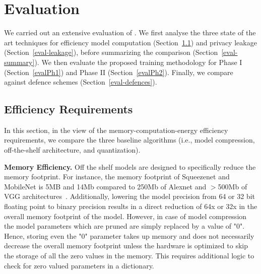 \section{Evaluation}
\label{compare}

We carried out an extensive evaluation of \method.
We first analyse the three state of the art techniques for efficiency model computation (Section~\ref{eval-efficiency}) and privacy leakage (Section~\ref{eval-leakage}), before summarizing the comparison (Section~\ref{eval-summary}).
We then evaluate the proposed training methodology for Phase I (Section~\ref{evalPh1}) and Phase II (Section~\ref{evalPh2}).
Finally, we compare \method~ against defence schemes (Section~\ref{eval-defences}). %


\subsection{Efficiency Requirements}
\label{eval-efficiency}

In this section, in the view of the memory-computation-energy efficiency requirements, we compare the three baseline algorithms (i.e., model compression, off-the-shelf architecture, and quantization).


\noindent\textbf{Memory Efficiency.} Off the shelf models are designed to specifically reduce the memory footprint.
For instance, the memory footprint of Squeezenet and MobileNet is 5MB and 14Mb compared to 250Mb of Alexnet and $>$500Mb of VGG architectures~\cite{DBLP:journals/corr/IandolaMAHDK16,conf/cvpr/SandlerHZZC18}.
Additionally, lowering the model precision from 64 or 32 bit floating point to binary precision results in a direct reduction of 64x or 32x in the overall memory footprint of the model.
However, in case of model compression the model parameters which are pruned are simply replaced by a value of "0".
Hence, storing even the "0" parameter takes up memory and does not necessarily decrease the overall memory footprint unless the hardware is optimized to skip the storage of all the zero values in the memory.
This requires additional logic to check for zero valued parameters in a dictionary.


